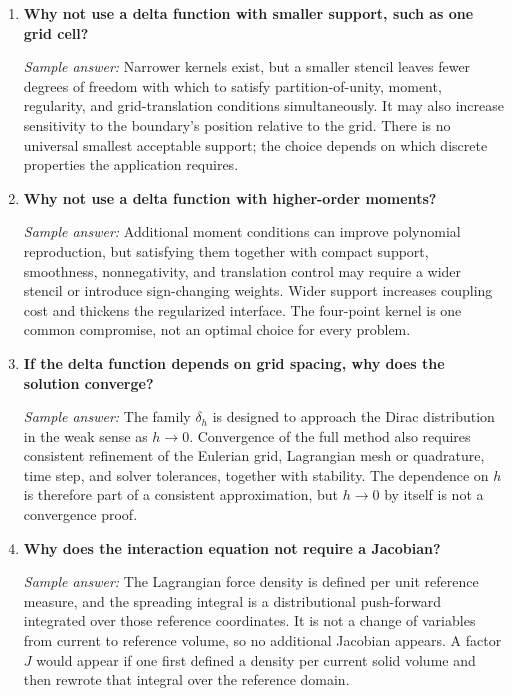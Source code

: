 \documentclass[11pt]{article}
\begin{document}
\begin{enumerate}[label=\arabic*.]
\item \textbf{Why not use a delta function with smaller support, such as one grid cell?}

\textit{Sample answer:}  
Narrower kernels exist, but a smaller stencil leaves fewer degrees of freedom with which to satisfy partition-of-unity, moment, regularity, and grid-translation conditions simultaneously. It may also increase sensitivity to the boundary's position relative to the grid. There is no universal smallest acceptable support; the choice depends on which discrete properties the application requires.

\item \textbf{Why not use a delta function with higher-order moments?}

\textit{Sample answer:}  
Additional moment conditions can improve polynomial reproduction, but satisfying them together with compact support, smoothness, nonnegativity, and translation control may require a wider stencil or introduce sign-changing weights. Wider support increases coupling cost and thickens the regularized interface. The four-point kernel is one common compromise, not an optimal choice for every problem.

\item \textbf{If the delta function depends on grid spacing, why does the solution converge?}

\textit{Sample answer:}  
The family $\delta_h$ is designed to approach the Dirac distribution in the weak sense as $h\to0$. Convergence of the full method also requires consistent refinement of the Eulerian grid, Lagrangian mesh or quadrature, time step, and solver tolerances, together with stability. The dependence on $h$ is therefore part of a consistent approximation, but $h\to0$ by itself is not a convergence proof.

\item \textbf{Why does the interaction equation not require a Jacobian?}

\textit{Sample answer:}  
The Lagrangian force density is defined per unit reference measure, and the spreading integral is a distributional push-forward integrated over those reference coordinates. It is not a change of variables from current to reference volume, so no additional Jacobian appears. A factor $J$ would appear if one first defined a density per current solid volume and then rewrote that integral over the reference domain.

\end{enumerate}
\end{document}
